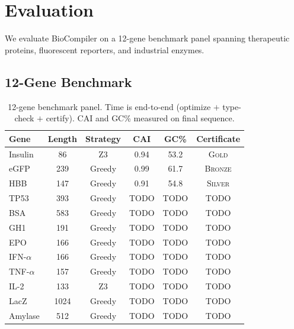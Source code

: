 \documentclass[runningheads]{llncs}
\newcommand{\GOLD}{\textsc{Gold}\xspace}
\newcommand{\SILVER}{\textsc{Silver}\xspace}
\newcommand{\BRONZE}{\textsc{Bronze}\xspace}
\begin{document}
\section{Evaluation}\label{sec:eval}


We evaluate BioCompiler on a 12-gene benchmark panel spanning
therapeutic proteins, fluorescent reporters, and industrial enzymes.

\subsection{12-Gene Benchmark}

\begin{table}[t]
\centering
\caption{12-gene benchmark panel. Time is end-to-end (optimize $+$
         type-check $+$ certify). CAI and GC\% measured on final
         sequence.}
\label{tab:benchmarks}
\begin{tabular}{lccccc}
\toprule
\textbf{Gene} & \textbf{Length} & \textbf{Strategy} &
  \textbf{CAI} & \textbf{GC\%} & \textbf{Certificate} \\
\midrule
Insulin  & 86   & Z3     & 0.94 & 53.2 & \GOLD   \\
eGFP     & 239  & Greedy & 0.99 & 61.7 & \BRONZE \\
HBB      & 147  & Greedy & 0.91 & 54.8 & \SILVER \\
TP53     & 393  & Greedy & TODO & TODO & TODO   \\
BSA      & 583  & Greedy & TODO & TODO & TODO   \\
GH1      & 191  & Greedy & TODO & TODO & TODO   \\
EPO      & 166  & Greedy & TODO & TODO & TODO   \\
IFN-$\alpha$ & 166 & Greedy & TODO & TODO & TODO \\
TNF-$\alpha$ & 157 & Greedy & TODO & TODO & TODO \\
IL-2     & 133  & Z3     & TODO & TODO & TODO   \\
LacZ     & 1024 & Greedy & TODO & TODO & TODO   \\
Amylase  & 512  & Greedy & TODO & TODO & TODO   \\
\bottomrule
\end{tabular}
\end{table}
\end{document}
